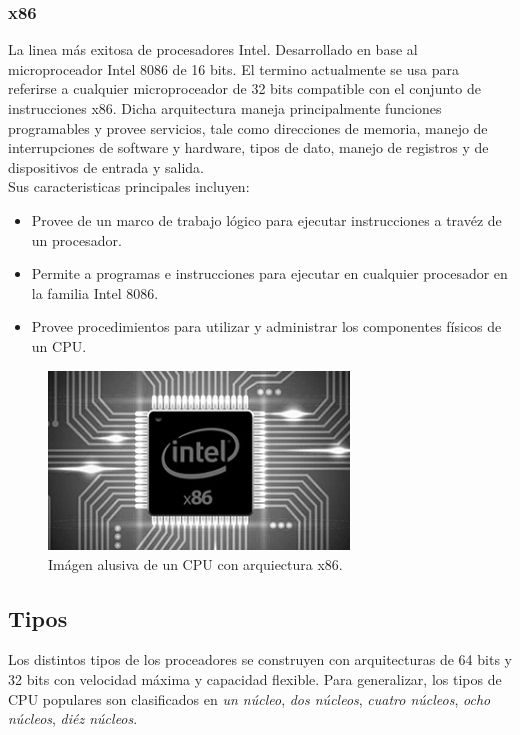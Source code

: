 \documentclass[letterpaper, 12pt]{article}
\begin{document}
\begin{justify}
        \subsubsection*{x86}
        \justify
        La linea más exitosa de procesadores Intel. Desarrollado en base al microproceador Intel 8086 de 16 bits. El termino actualmente se usa para referirse a cualquier microproceador de 32 bits
        compatible con el conjunto de instrucciones x86. Dicha arquitectura maneja principalmente funciones programables y provee servicios, tale como direcciones de memoria, manejo de interrupciones de software y hardware,
        tipos de dato, manejo de registros y de dispositivos de entrada y salida.
        \\\newline
        Sus caracteristicas principales incluyen:
        \begin{itemize}
            \item Provee de un marco de trabajo lógico para ejecutar instrucciones a travéz de un procesador.
            \item Permite a programas e instrucciones para ejecutar en cualquier procesador en la familia Intel 8086.
            \item Provee procedimientos para utilizar y administrar los componentes físicos de un CPU.
        \end{itemize} 
        \begin{figure}[H]
            \centering
            \includegraphics[width=8cm]{x86.jpg}
            \caption{Imágen alusiva de un CPU con arquiectura x86.}
        \end{figure}

        \subsection{Tipos}
        \justify
        Los distintos tipos de los proceadores se construyen con arquitecturas de 64 bits y 32 bits con velocidad máxima y capacidad flexible. Para generalizar, los tipos de CPU populares son clasificados
        en \emph{un núcleo}, \emph{dos núcleos}, \emph{cuatro núcleos}, \emph{ocho núcleos}, \emph{diéz núcleos}.

\end{justify}
\end{document}
